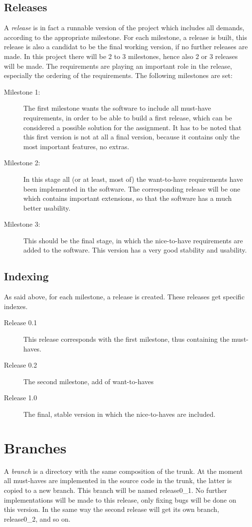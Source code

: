 \documentclass{report}
\begin{document}
\subsection{Releases}
A {\it release} is in fact a runnable version of the project which includes all demands, according to the appropriate milestone.
For each milestone, a release is built, this release is also a candidat to be the final working version, if no further releases are made.
In this project there will be 2 to 3 milestones, hence also 2 or 3 releases will be made.
The requirements are playing an important role in the release, especially the ordering of the requirements.
The following milestones are set:
\begin{description}
\item[Milestone 1:]
The first milestone wants the software to include all must-have requirements, in order to be able to build a first release, which can be considered a possible solution for the assignment.
It has to be noted that this first version is not at all a final version, because it contains only the most important features, no extras.
\item[Milestone 2:]
In this stage all (or at least, most of) the want-to-have requirements have been implemented in the software.
The corresponding release will be one which contains important extensions, so that the software has a much better usability.
\item[Milestone 3:]
This should be the final stage, in which the nice-to-have requirements are added to the software. This version has a very good stability and usability.
\end{description}
\subsection{Indexing}
As said above, for each milestone, a release is created. These releases get specific indexes.
\begin{description}
\item[Release 0.1]
This release corresponds with the first milestone, thus containing the must-haves.
\item[Release 0.2]
The second milestone, add of want-to-haves
\item[Release 1.0]
The final, stable version in which the nice-to-haves are included.
\end{description}
\section{Branches}
A {\it branch} is a directory with the same composition of the trunk.
At the moment all must-haves are implemented in the source code in the trunk, the latter is copied to a new branch.
This branch will be named release0\_1.
No further implementations will be made to this release, only fixing bugs will be done on this version.
In the same way the second release will get its own branch, release0\_2, and so on.
\end{document}
